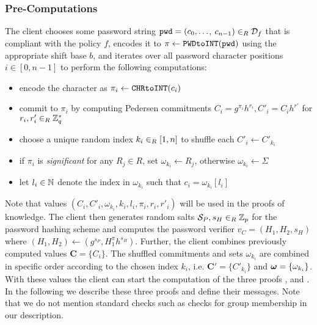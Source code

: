 \subsubsection{Pre-Computations}
The client chooses some password string $\mathtt{pwd}=(c_0,\ldots$, $c_{n-1})\in_R\mathcal{D}_f$ that is compliant with the policy $f$, encodes it to $\pi\gets\texttt{PWDtoINT}(\mathtt{pwd})$ using the appropriate shift base $b$, and iterates over all password character positions $i\in[0,n-1]$ to perform the following computations:
\begin{itemize}
  \item encode the character as $\pi_i\gets\texttt{CHRtoINT}(c_i)$
  \item commit to $\pi_i$ by computing Pedersen commitments $C_i=g^{\pi_i}h^{r_i}, C'_i=C_i h^{r'}$ for $r_i,r'_i\in_R\mathbb{Z}^\ast_q$
  \item choose a unique random index $k_{i} \in_R[1,n]$ to shuffle each $C'_i\gets C'_{k_i}$
  \item if $\pi_i$ is \emph{significant} for any $R_j\in R$, set $\omega_{k_i}\gets R_j$, otherwise $\omega_{k_i}\gets\Sigma$
  \item let $l_i\in\mathbb{N}$ denote the index in $\omega_{k_i}$ such that $c_i=\omega_{k_i}[l_i]$
\end{itemize}
Note that values $(C_i, C'_i, \omega_{k_i}, k_{i}, l_i, \pi_i, r_i, r'_i)$ will be used in the proofs of knowledge.
The client then generates random salts $\mathcal{S}_P,s_H\in_R\mathbb{Z}_p$ for the password hashing scheme and computes the password verifier $v_C=(H_1, H_2, s_H)$ where $(H_1,H_2)\gets (g^{s_P}, H_1^\pi h^{s_H})$.
Further, the client combines previously computed values $\bm C = \{C_{i}\}$.
The shuffled commitments and sets $\omega_{k_i}$ are combined in specific order according to the chosen index $k_i$, i.e. $\bm C' = \{C'_{k_{i}}\}$ and $\boldsymbol{\mathbf{\omega}} = \{\omega_{k_i}\}$.
With these values the client can start the computation of the three proofs \PoM, \PoE and \PoS.
In the following we describe these three proofs and define their messages. Note that we do not mention standard checks such as checks for group membership in our description.

